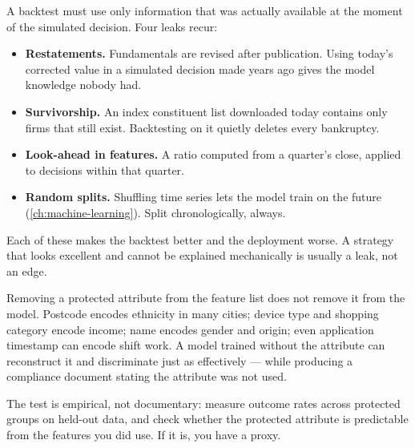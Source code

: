 \begin{cautionbox}
A backtest must use only information that was actually available at the moment
of the simulated decision. Four leaks recur:
\begin{itemize}
  \item \textbf{Restatements.} Fundamentals are revised after publication.
        Using today's corrected value in a simulated decision made years ago
        gives the model knowledge nobody had.
  \item \textbf{Survivorship.} An index constituent list downloaded today
        contains only firms that still exist. Backtesting on it quietly deletes
        every bankruptcy.
  \item \textbf{Look-ahead in features.} A ratio computed from a quarter's
        close, applied to decisions within that quarter.
  \item \textbf{Random splits.} Shuffling time series lets the model train on
        the future (\cref{ch:machine-learning}). Split chronologically, always.
\end{itemize}
Each of these makes the backtest better and the deployment worse. A strategy
that looks excellent and cannot be explained mechanically is usually a leak,
not an edge.
\end{cautionbox}

\begin{cautionbox}
Removing a protected attribute from the feature list does not remove it from
the model. Postcode encodes ethnicity in many cities; device type and shopping
category encode income; name encodes gender and origin; even application
timestamp can encode shift work. A model trained without the attribute can
reconstruct it and discriminate just as effectively --- while producing a
compliance document stating the attribute was not used.

The test is empirical, not documentary: measure outcome rates across protected
groups on held-out data, and check whether the protected attribute is
predictable from the features you did use. If it is, you have a proxy.
\end{cautionbox}


